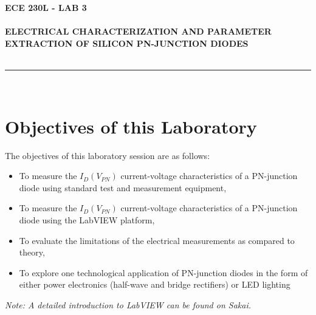 \documentclass[12pt]{../manual}
\begin{document}
\begin{center}
\textbf{\huge ECE 230L - LAB 3}\\~\\
\textbf{\large ELECTRICAL CHARACTERIZATION AND PARAMETER EXTRACTION OF SILICON PN-JUNCTION DIODES}\\~\\
\rule{6.5in}{0.5mm}\\
\end{center}

\tableofcontents

\listoffigures

\newpage
%
\section{Objectives of this Laboratory}
The objectives of this laboratory session are as follows:
\begin{itemize}
\item To measure the $I_D(V_{PN})$ current-voltage characteristics of a PN-junction diode using standard test and measurement equipment,
\item To measure the $I_D(V_{PN})$ current-voltage characteristics of a PN-junction diode using the LabVIEW platform,
\item To evaluate the limitations of the electrical measurements as compared to theory,
\item To explore one technological application of PN-junction diodes in the form of either power electronics (half-wave and bridge rectifiers) or LED lighting
\end{itemize}
\textit{Note: A detailed introduction to LabVIEW can be found on Sakai.}
\end{document}
